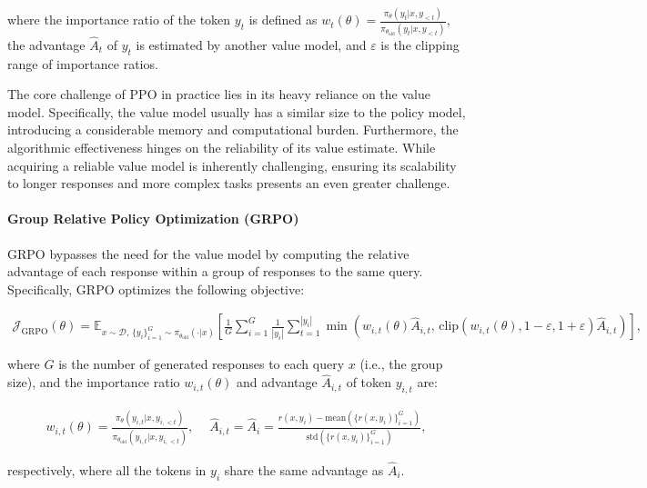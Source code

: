 where the importance ratio of the token $y_t$ is defined as $
w_{t}(\theta) = \frac{ \pi_{\theta} (y_{t} | x, y_{<t}) }{ \pi_{\theta_\text{old}} (y_{t} | x,y_{<t})} $, the advantage $\widehat{A}_{t}$ of $y_t$ is estimated by another value model, and $\varepsilon$ is the clipping range of importance ratios.

The core challenge of PPO in practice lies in its heavy reliance on the value model. Specifically, the value model usually has a similar size to the policy model, introducing a considerable memory and computational burden. Furthermore, the algorithmic effectiveness hinges on the reliability of its value estimate. While acquiring a reliable value model is inherently challenging, ensuring its scalability to longer responses and more complex tasks presents an even greater challenge.

\paragraph{Group Relative Policy Optimization (GRPO)} GRPO \citep{grpo} bypasses the need for the value model by computing the relative advantage of each response within a group of responses to the same query. Specifically, GRPO optimizes the following objective:

\begin{align}
\label{equ:grpo}
\mathcal{J}_\text{GRPO}(\theta) = \mathbb{E}_{ x \sim \mathcal{D},\, \{y_i\}_{i=1}^G \sim \pi_{\theta_\text{old}}( \cdot | x) }
\left[ \frac{1}{G} \sum_{i=1}^{G} \frac{1}{|y_i|} \sum_{t=1}^{|y_i|} 
\min \left( w_{i,t}(\theta) \widehat{A}_{i,t},  \, \mathrm{clip} \left( w_{i,t}(\theta), 1 - {\varepsilon}, 1 + {\varepsilon}\right) \widehat{A}_{i,t} \right)
\right],
\end{align}

where $G$ is the number of generated responses to each query $x$ (i.e., the group size), and the importance ratio $w_{i,t}(\theta)$ and advantage $\widehat{A}_{i,t}$ of token $y_{i,t}$ are:

\begin{align}
    w_{i,t}(\theta)=\frac{ \pi_{\theta} (y_{i,t} | x, y_{i,<t}) }{ \pi_{\theta_\text{old}} (y_{i,t} | x,y_{i,<t})},\quad\ 
    \widehat{A}_{i,t} = \widehat{A}_{i} = \frac{r(x, y_i) - \mathrm{mean} \left( \{ r(x, y_i) \}_{i=1}^G \right) }{ \mathrm{std} \left( \{ r(x, y_i) \}_{i=1}^G \right) },
\end{align}

respectively, where all the tokens in $y_i$ share the same advantage as $\widehat{A}_{i}$.

